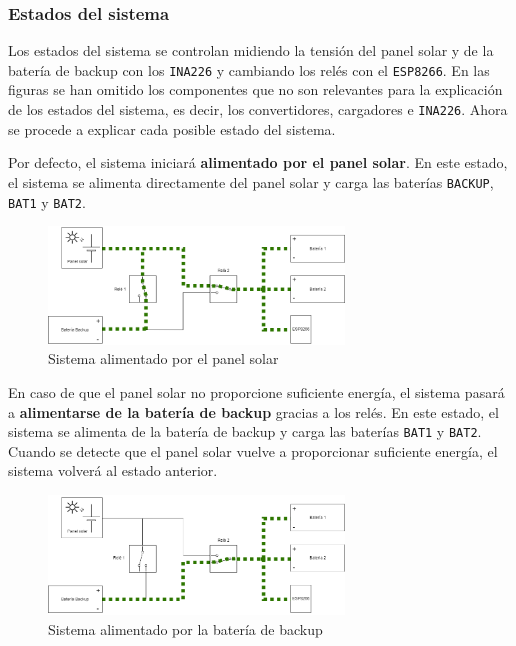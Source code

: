 \subsubsection{Estados del sistema}\label{subsubsec:estados}

Los estados del sistema se controlan midiendo la tensión del panel solar y de la batería de backup con los \texttt{INA226} y cambiando los relés con el \texttt{ESP8266}. En las figuras se han omitido los componentes que no son relevantes para la explicación de los estados del sistema, es decir, los convertidores, cargadores e \texttt{INA226}. Ahora se procede a explicar cada posible estado del sistema.

Por defecto, el sistema iniciará \textbf{alimentado por el panel solar}. En este estado, el sistema se alimenta directamente del panel solar y carga las baterías \texttt{BACKUP}, \texttt{BAT1} y \texttt{BAT2}.

\begin{figure}[H]
    \centering
    \includegraphics[width=0.7\textwidth]{images/2-hardware/Estado_solar.png}
    \caption{Sistema alimentado por el panel solar}
    \label{fig:hardware/estados/solar}
\end{figure}

En caso de que el panel solar no proporcione suficiente energía, el sistema pasará a \textbf{alimentarse de la batería de backup} gracias a los relés. En este estado, el sistema se alimenta de la batería de backup y carga las baterías \texttt{BAT1} y \texttt{BAT2}. Cuando se detecte que el panel solar vuelve a proporcionar suficiente energía, el sistema volverá al estado anterior.

\begin{figure}[H]
    \centering
    \includegraphics[width=0.7\textwidth]{images/2-hardware/Estado_backup.png}
    \caption{Sistema alimentado por la batería de backup}
    \label{fig:hardware/estados/backup}
\end{figure}

